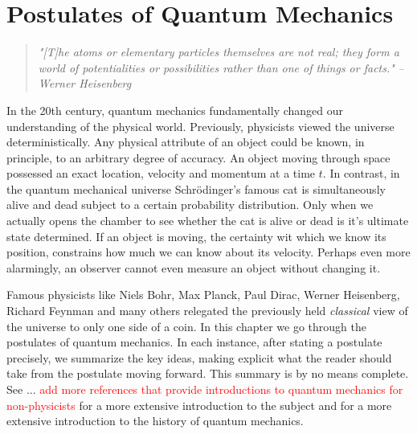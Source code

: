 
\chapter{Postulates of Quantum Mechanics} %

\label{Chapter3-postulates} %

\begin{quote}
\textit{"[T]he atoms or elementary particles themselves are not real; they form a world of potentialities or possibilities rather than one of things or facts."}
\bigskip
\hfill \textit{--Werner Heisenberg}
\end{quote}

In the 20th century, quantum mechanics fundamentally changed our understanding of the physical world.  Previously, physicists viewed the universe deterministically.  Any physical attribute of an object could be known, in principle, to an arbitrary degree of accuracy.  An object moving through space possessed an exact location, velocity and momentum at a time $t$. In contrast, in the quantum mechanical universe Schrödinger's famous cat is simultaneously alive and dead subject to a certain probability distribution.  Only when we actually opens the chamber to see whether the cat is alive or dead is it's ultimate state determined. If an object is moving, the certainty wit which we know its position, constrains how much we can know about its velocity.  Perhaps even more alarmingly, an observer cannot even measure an object without changing it.

Famous physicists like Niels Bohr, Max Planck, Paul Dirac, Werner Heisenberg, Richard Feynman and many others relegated the previously held {\emph{classical}} view of the universe to only one side of a coin.  In this chapter we go through the postulates of quantum mechanics.  In each instance, after stating a postulate precisely, we summarize the key ideas, making explicit what the reader should take from the postulate moving forward.  This summary is by no means complete.  See ... \textcolor{red}{add more references that provide introductions to quantum mechanics for non-physicists} for a more extensive introduction to the subject and \cite{dorai2018} for a more extensive introduction to the history of quantum mechanics.


